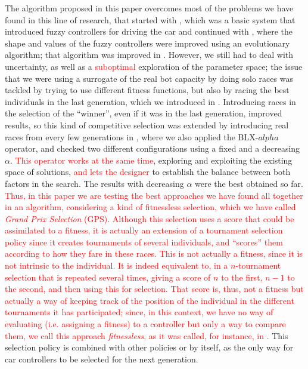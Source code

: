 \documentclass[10pt,journal,compsoc]{IEEEtran}
\begin{document}
The algorithm proposed in this paper overcomes most of the problems we
have found in this line of research, that started with
\cite{salem_evo17}, which was a basic system that
introduced fuzzy controllers for driving the car and continued with
\cite{salem_evo18}, where the shape and values of the
fuzzy controllers were improved using an evolutionary algorithm; that
algorithm was improved in \cite{salem_ipmu18}. However,
we still had to deal with uncertainty, as well as a \textcolor{red}{suboptimal} exploration of the parameter space; the issue that we were using a surrogate of the real bot capacity by doing solo races was tackled by trying to use different fitness functions, but also by racing the best individuals in the last generation, which we introduced in \cite{salem_cig2018}. Introducing races in the selection of the ``winner'', even if it was in the last generation, improved results, so this kind of competitive selection was extended by introducing real
races from every few generations in 
\cite{DBLP:conf/cig/SalemMG19}, where we also applied the BLX-$alpha$ operator, and checked two different configurations using a fixed and a decreasing $\alpha$. \textcolor{red}{This operator works at the same time}, exploring and exploiting the existing space of solutions, \textcolor{red}{and lets the designer }to establish the balance between both factors in the search. The results with decreasing $\alpha$ were the best obtained so far.
\textcolor{red}{
Thus, in this paper we are testing the best approaches we have found all together in an algorithm, considering a kind of fitnessless selection, which we have called \textit{Grand Prix Selection} (GPS). Although this selection uses a score that could be assimilated to a fitness, it is actually an extension of a tournament selection policy since it creates tournaments of several individuals, and ``scores'' them according to how they fare in these races. This is not actually a fitness, since it is not intrinsic to the individual. It is indeed equivalent to, in a $n$-tournament selection that is repeated several times, giving a score of $n$ to the first, $n-1$ to the second, and then using this for selection. That score is, thus, not a fitness but actually a way of keeping track of the position of the individual in the different tournaments it has participated; since, in this context, we have no way of evaluating (i.e. assigning a fitness) to a controller but only a way to compare them, we call this approach {\em fitnessless}, as it was called, for instance, in \cite{jaskowski2008winning}.
}
This selection policy is combined with other policies or by itself, as the only way for car controllers to be selected for the next generation.
\end{document}
